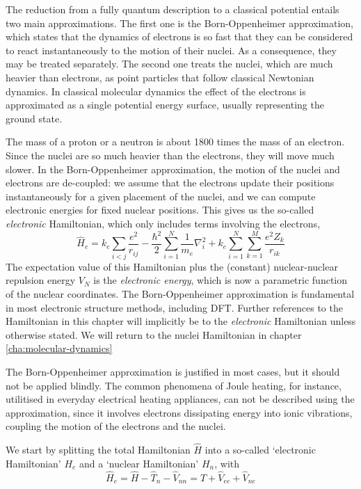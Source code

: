 \documentclass[11pt,bibliography=totoc,index=totoc]{scrbook}   %
\begin{document}
The reduction from a fully quantum description to a classical potential entails two main approximations. The first one is the Born-Oppenheimer approximation, which states that the dynamics of electrons is so fast that they can be considered to react instantaneously to the motion of their nuclei. As a consequence, they may be treated separately. The second one treats the nuclei, which are much heavier than electrons, as point particles that follow classical Newtonian dynamics. In classical molecular dynamics the effect of the electrons is approximated as a single potential energy surface, usually representing the ground state.

The mass of a proton or a neutron is about 1800 times the mass of an electron.
Since the nuclei are so much heavier than the electrons, they will move much
slower. In the Born-Oppenheimer approximation, the motion of the 
nuclei and
electrons are de-coupled: we assume that the electrons update their positions
instantaneously for a given placement of the nuclei, and we can compute
electronic energies for fixed nuclear positions. This gives us the so-called
\emph{electronic} Hamiltonian, which only includes terms involving the
electrons,
\begin{equation}
  \hat{H}_e = 
	k_e  \sum_{i<j}\frac{e^2}{r_{ij}}
	-\frac{\hbar^2}{2}\sum_{i=1}^N\frac{1}{m_e}\nabla_i^2
		+ k_e \sum_{i=1}^N\sum_{k=1}^M \frac{e^2Z_k}{r_{ik}}
  \label{eq:el-hamiltonian}
\end{equation}
The expectation value of this Hamiltonian plus the (constant) nuclear-nuclear 
repulsion energy $V_N$ is the \emph{electronic energy}, which
is now a parametric function of the nuclear coordinates. The Born-Oppenheimer
approximation is fundamental in most electronic structure methods, including
DFT. Further references to the Hamiltonian in this chapter will implicitly 
be to the \emph{electronic} Hamiltonian unless otherwise stated. 
We will return to the nuclei Hamiltonian in chapter \ref{cha:molecular-dynamics}



The Born-Oppenheimer approximation is justified in most 
cases,\cite[p. 111]{Cramer:2004} but it should not be applied blindly.
The common phenomena of Joule heating, for instance, utilitised in everyday electrical heating appliances, can not be described using the approximation, since it involves electrons dissipating energy into ionic vibrations, coupling the motion of the electrons and the nuclei.\cite{Horsfield:2004b}

We start by splitting the total Hamiltonian $\hat{H}$ into a so-called `electronic Hamiltonian' $H_e$ and a `nuclear Hamiltonian' $H_n$, with
\begin{equation}
  \hat{H}_e = \hat{H} - \hat{T}_n - \hat{V}_{nn} = \hat{T} + \hat{V}_{ee} + \hat{V}_{ne}
\end{equation}
\end{document}
